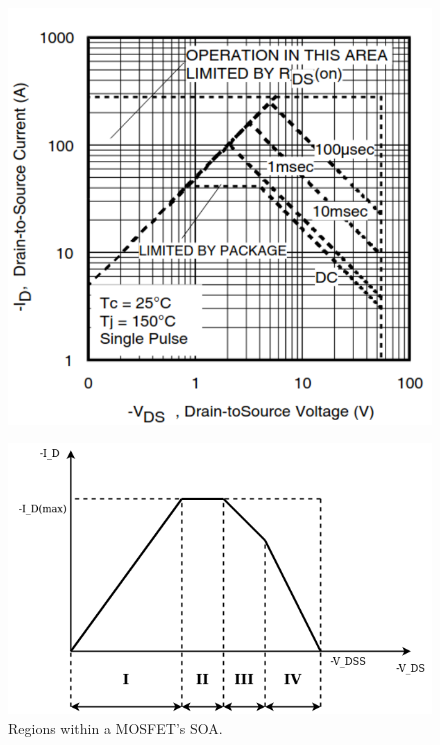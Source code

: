 \documentclass[main.tex]{subfiles}
\begin{document}
    \begin{figure}[!h]
        \centering
        \begin{minipage}{.5\textwidth}
          \centering
          \includegraphics[width=0.8\linewidth]{media/typical_SOA_plot.png}
          \label{fig:typical_SOA_plot}
        \end{minipage}%
        \begin{minipage}{.5\textwidth}
          \centering
          \includegraphics[width=\linewidth]{media/SOA_regions.drawio.png}
          \caption{Regions within a MOSFET's SOA.}
        \label{fig:SOA_regions}
        \end{minipage}
    \end{figure}
\end{document}
